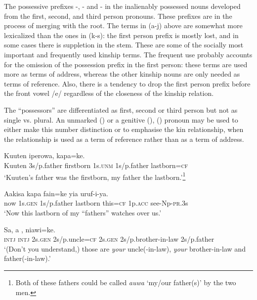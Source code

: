 The possessive prefixes -, - and - in the inalienably possessed nouns developed from the first, second, and third person pronouns. These prefixes are in the process of merging with the root. The terms in (a-j) above are somewhat more lexicalized than the ones in (k-s): the first person prefix is mostly lost, and in some cases there is suppletion in the stem. These are some of the socially most important and frequently used kinship terms. The frequent use probably accounts for the omission of the possession prefix in the first person: these terms are used more as terms of address, whereas the other kinship nouns are only needed as terms of reference. Also, there is a tendency to drop the first person prefix before the front vowel /e/ regardless of the closeness of the kinship relation.

The ``possessors'' are differentiated as first, second or third person but not as single vs. plural. An unmarked () or a genitive (), () pronoun may be used to either make this number distinction or to emphasise the kin relationship, when the relationship is used as a term of reference rather than as a term of address.

\ea%
\label{ex:x1311}
\gll Kuuten  iperowa,   kapa=ke. \\
Kuuten 3s/p.father firstborn 1s.\textsc{unm} 1s/p.father lastborn=\textsc{cf}\\
\glt`Kuuten's father was the firstborn, my father the lastborn.'\footnote{Both of these fathers could be called \textit{auwa} `my/our father(s)' by the two men.}
\z

\ea%
\label{ex:x28}
\gll Aakisa    kapa fain=ke yia uruf-i-ya. \\
now 1s.\textsc{gen} 1s/p.father lastborn this=\textsc{cf} 1p.\textsc{acc} see-Np-\textsc{pr}.3s\\
\glt`Now this lastborn of my ``fathers'' watches over us.'
\z

\ea%
\label{ex:x1312}
\gll Sa, a  ,   niawi=ke.\\
\textsc{intj} \textsc{intj} 2s.\textsc{gen} 2s/p.uncle=\textsc{cf} 2s.\textsc{gen} 2s/p.brother-in-law 2s/p.father\\
\glt`(Don't you understand,) those are \textit{your} uncle(-in-law), \textit{your} brother-in-law and father(-in-law).'
\z

